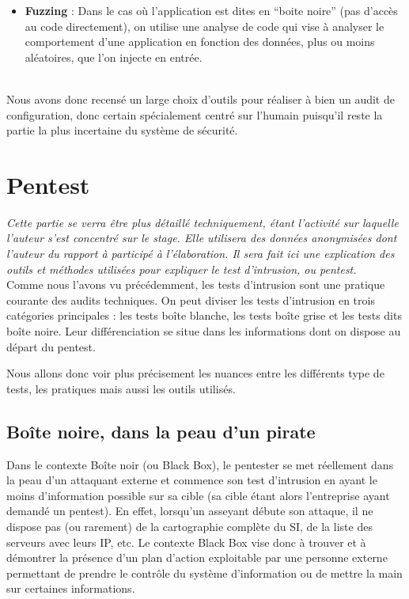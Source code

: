 \documentclass[a4paper]{memoir}
\begin{document}
\begin{itemize}
\item \textbf{Fuzzing} : Dans le cas où l'application est dites en ``boite noire'' (pas d'accès au code directement), on utilise une analyse de code qui vise à analyser le comportement d'une application en fonction des données, plus ou moins aléatoires, que l'on injecte en entrée.\\\\
  
\end{itemize}

Nous avons donc recensé un large choix d'outils pour réaliser à bien un audit de configuration, donc certain spécialement centré sur l'humain puisqu'il reste la partie la plus incertaine du système de sécurité.\\
  
\chapter{Pentest}

\textit{Cette partie se verra être plus détaillé techniquement, étant l'activité sur laquelle l'auteur s'est concentré sur le stage. Elle utilisera des données anonymisées dont l'auteur du rapport à participé à l'élaboration. Il sera fait ici une explication des outils et méthodes utilisées pour expliquer le test d'intrusion, ou pentest.}\\

Comme nous l'avons vu précédemment, les tests d'intrusion sont une pratique courante des audits techniques. On peut diviser les tests d'intrusion en trois catégories principales : les tests boîte blanche, les tests boîte grise et les tests dits boîte noire. Leur différenciation se situe dans les informations dont on dispose au départ du pentest. 

Nous allons donc voir plus précisement les nuances entre les différents type de tests, les pratiques mais aussi les outils utilisés.

\section{Boîte noire, dans la peau d'un pirate}

Dans le contexte Boîte noir (ou Black Box), le pentester se met réellement dans la peau d’un attaquant externe et commence son test d’intrusion en ayant le moins d’information possible sur sa cible (sa cible étant alors l’entreprise ayant demandé un pentest). En effet, lorsqu’un asseyant débute son attaque, il ne dispose pas (ou rarement) de la cartographie complète du SI, de la liste des serveurs avec leurs IP, etc. Le contexte Black Box vise donc à trouver et à démontrer la présence d’un plan d’action exploitable par une personne externe permettant de prendre le contrôle du système d’information ou de mettre la main sur certaines informations.
\end{document}
